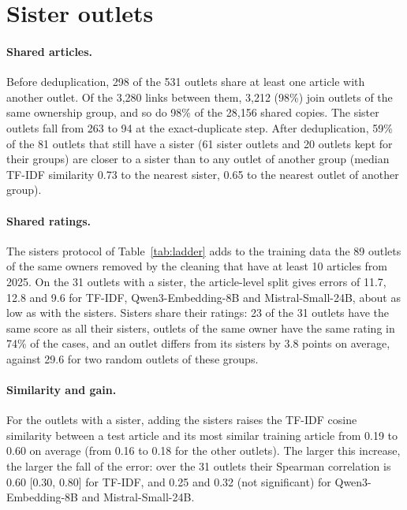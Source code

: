 \documentclass[11pt,a4paper]{article}
\begin{document}
\section{Sister outlets}\label{app:sisters}
\paragraph{Shared articles.} Before deduplication, 298 of the 531 outlets share at least one article with another
outlet. Of the 3,280 links between them, 3,212 (98\%) join outlets of the same ownership group, and so do 98\% of the
28,156 shared copies. The sister outlets fall from 263 to 94 at the exact-duplicate step. After deduplication, 59\% of
the 81 outlets that still have a sister (61 sister outlets and 20 outlets kept for their groups) are closer to a sister
than to any outlet of another group (median TF-IDF similarity 0.73 to the nearest sister, 0.65 to the nearest outlet of
another group).

\paragraph{Shared ratings.} The sisters protocol of Table~\ref{tab:ladder} adds to the training data the 89 outlets of the
same owners removed by the cleaning that have at least 10 articles from 2025. On the 31 outlets with a sister, the
article-level split gives errors of 11.7, 12.8 and 9.6 for TF-IDF, Qwen3-Embedding-8B and Mistral-Small-24B, about as low
as with the sisters. Sisters share their ratings: 23 of the 31 outlets have the same score as all their sisters,
outlets of the same owner have the same rating in 74\% of the cases, and an outlet differs from its sisters by 3.8
points on average, against 29.6 for two random outlets of these groups.

\paragraph{Similarity and gain.} For the outlets with a sister, adding the sisters raises the TF-IDF cosine similarity
between a test article and its most similar training article from 0.19 to 0.60 on average (from 0.16 to 0.18 for the
other outlets). The larger this increase, the larger the fall of the error: over the 31 outlets their Spearman
correlation is 0.60 [0.30, 0.80] for TF-IDF, and 0.25 and 0.32 (not significant) for Qwen3-Embedding-8B and
Mistral-Small-24B.
\end{document}
